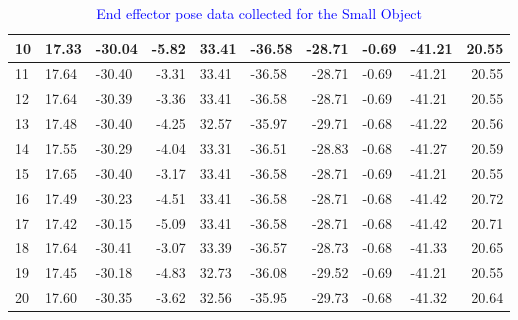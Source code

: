 \begin{table}[]
\begin{tabular}{|l|l|l|r|l|l|r|l|l|r|}
10                                                  & 17.33           & -30.04           & -5.82                     & 33.41  & -36.58 & -28.71           & -0.69  & -41.21  & 20.55            \\ \hline
11                                                  & 17.64           & -30.40           & -3.31                     & 33.41  & -36.58 & -28.71           & -0.69  & -41.21  & 20.55            \\ \hline
12                                                  & 17.64           & -30.39           & -3.36                     & 33.41  & -36.58 & -28.71           & -0.69  & -41.21  & 20.55            \\ \hline
13                                                  & 17.48           & -30.40           & -4.25                     & 32.57  & -35.97 & -29.71           & -0.68  & -41.22  & 20.56            \\ \hline
14                                                  & 17.55           & -30.29           & -4.04                     & 33.31  & -36.51 & -28.83           & -0.68  & -41.27  & 20.59            \\ \hline
15                                                  & 17.65           & -30.40           & -3.17                     & 33.41  & -36.58 & -28.71           & -0.69  & -41.21  & 20.55            \\ \hline
16                                                  & 17.49           & -30.23           & -4.51                     & 33.41  & -36.58 & -28.71           & -0.68  & -41.42  & 20.72            \\ \hline
17                                                  & 17.42           & -30.15           & -5.09                     & 33.41  & -36.58 & -28.71           & -0.68  & -41.42  & 20.71            \\ \hline
18                                                  & 17.64           & -30.41           & -3.07                     & 33.39  & -36.57 & -28.73           & -0.68  & -41.33  & 20.65            \\ \hline
19                                                  & 17.45           & -30.18           & -4.83                     & 32.73  & -36.08 & -29.52           & -0.69  & -41.21  & 20.55            \\ \hline
20                                                  & 17.60           & -30.35           & -3.62                     & 32.56  & -35.95 & -29.73           & -0.68  & -41.32  & 20.64            \\ \hline
\end{tabular}
\caption{\textcolor{blue}{End effector pose data collected for the Small Object}}
\label{tab:ee-small-object}
\end{table}







